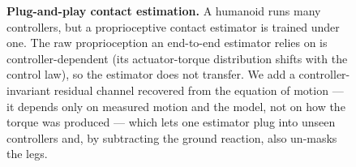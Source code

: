 \documentclass[conference]{IEEEtran}
\begin{document}
\begin{figure}[t]
\caption{\textbf{Plug-and-play contact estimation.} A humanoid runs many
controllers, but a proprioceptive contact estimator is trained under one. The raw
proprioception an end-to-end estimator relies on is \textcolor{red!70}{controller-dependent}
(its actuator-torque distribution shifts with the control law), so the estimator
does not transfer. We add a \textcolor{blue!70}{controller-invariant} residual
channel recovered from the equation of motion --- it depends only on measured
motion and the model, not on how the torque was produced --- which lets one
estimator plug into unseen controllers and, by subtracting the ground reaction,
also un-masks the legs.}
\label{fig:overview}
\end{figure}
\end{document}
